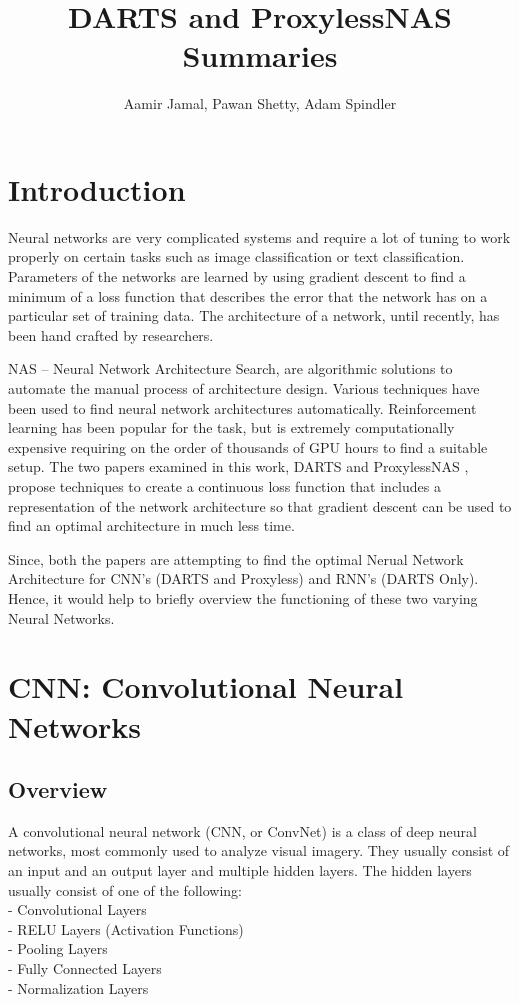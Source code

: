 \documentclass{ieee}
\title{DARTS and ProxylessNAS Summaries}
\author{Aamir Jamal, Pawan Shetty, Adam Spindler}
\begin{document}
\maketitle

\section{Introduction}
Neural networks are very complicated systems and require a lot of tuning to work properly on certain tasks such as image classification or text classification. Parameters of the networks are learned by using gradient descent to find a minimum of a loss function that describes the error that the network has on a particular set of training data. The architecture of a network, until recently, has been hand crafted by researchers.

NAS – Neural Network Architecture Search, are algorithmic solutions to automate the manual process of architecture design. Various techniques have been used to find neural network architectures automatically. Reinforcement learning has been popular for the task, but is extremely computationally expensive requiring on the order of thousands of GPU hours to find a suitable setup. The two papers examined in this work, DARTS \cite{liu2018darts} and ProxylessNAS \cite{cai2018proxylessnas}, propose techniques to create a continuous loss function that includes a representation of the network architecture so that gradient descent can be used to find an optimal architecture in much less time.

Since, both the papers are attempting to find the optimal Nerual Network Architecture for CNN's (DARTS and Proxyless) and RNN's (DARTS Only). Hence, it would help to briefly overview the functioning of these two varying Neural Networks.


\section{CNN: Convolutional Neural Networks}
\subsection{Overview}
A convolutional neural network (CNN, or ConvNet) is a class of deep neural networks, most commonly used to analyze visual imagery. They usually consist of an input and an output layer and multiple hidden layers. The hidden layers usually consist of one of the following:\\
- Convolutional Layers \\
- RELU Layers (Activation Functions) \\
- Pooling Layers \\
- Fully Connected Layers \\
- Normalization Layers \\
\end{document}
